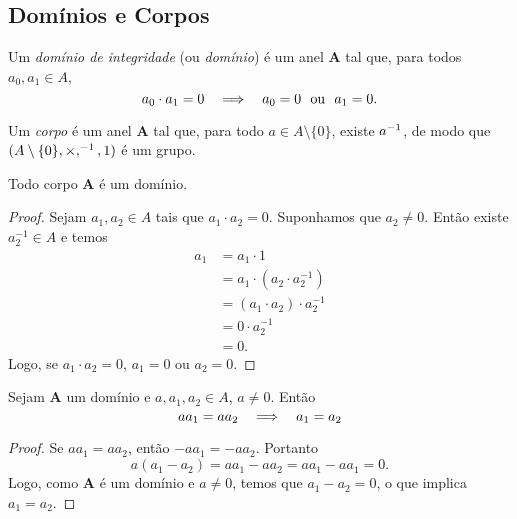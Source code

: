 \subsection{Domínios e Corpos}

\begin{defi}
Um \emph{domínio de integridade} (ou \emph{domínio}) é um anel $\bm A$ tal que, para todos $a_0,a_1 \in A$,
	\begin{equation*}
	a_0 \cdot a_1 = 0 \quad \Longrightarrow \quad a_0=0 \text{\ \ ou\ \ } a_1=0.
	\end{equation*}
\end{defi}

\begin{defi}
Um \emph{corpo} é um anel $\bm A$ tal que, para todo $a \in A \setminus \{0\}$, existe $a^{-1}$, de modo que $(A \setminus \{0\},\times,^{-1},1)$ é um grupo.
\end{defi}

\begin{prop}
\label{prop:corp.dom}
Todo corpo $\bm A$ é um domínio.
\end{prop}
\begin{proof}
	Sejam $a_1,a_2 \in A$ tais que $a_1 \cdot a_2=0$. Suponhamos que $a_2 \neq 0$. Então existe $a_2^{-1} \in A$ e temos
	\begin{equation*}
	\begin{split}
	a_1 &= a_1 \cdot 1 \\
		&= a_1 \cdot (a_2 \cdot a_2^{-1}) \\
		&= (a_1 \cdot a_2) \cdot a_2^{-1}\\
		&= 0 \cdot a_2^{-1} \\
		&= 0.
	\end{split}
	\end{equation*}
	Logo, se $a_1 \cdot a_2=0$, $a_1=0$ ou $a_2=0$.
\end{proof}

\begin{prop}
Sejam $\bm A$ um domínio e $a,a_1,a_2 \in A$, $a \neq 0$. Então
	\begin{equation*}
	aa_1 = aa_2 \quad \Longrightarrow \quad a_1=a_2
	\end{equation*}
\end{prop}
\begin{proof}
	Se $aa_1 = aa_2$, então $-aa_1 = -aa_2$. Portanto
	\begin{equation*}
	a(a_1-a_2) = aa_1 -aa_2 = aa_1 -aa_1 = 0.
	\end{equation*}
Logo, como $\bm A$ é um domínio e $a \neq 0$, temos que $a_1-a_2=0$, o que implica $a_1=a_2$.
\end{proof}

